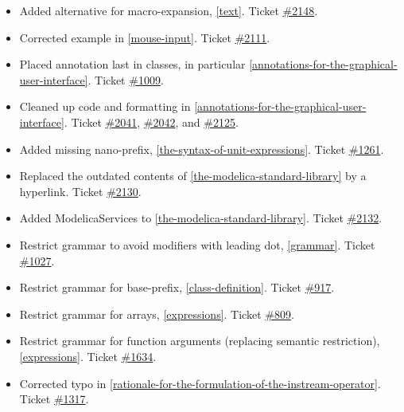 \begin{itemize}
\item
  Added alternative for macro-expansion, \autoref{text}. Ticket
  \href{https://github.com/modelica/ModelicaSpecification/issues/2148}{\#2148}.
\item
  Corrected example in \autoref{mouse-input}. Ticket
  \href{https://github.com/modelica/ModelicaSpecification/issues/2111}{\#2111}.
\item
  Placed annotation last in classes, in particular \autoref{annotations-for-the-graphical-user-interface}. Ticket
  \href{https://github.com/modelica/ModelicaSpecification/issues/1009}{\#1009}.
\item
  Cleaned up code and formatting in \autoref{annotations-for-the-graphical-user-interface}. Ticket
  \href{https://github.com/modelica/ModelicaSpecification/issues/2041}{\#2041},
  \href{https://github.com/modelica/ModelicaSpecification/issues/2042}{\#2042}, and
  \href{https://github.com/modelica/ModelicaSpecification/issues/2125}{\#2125}.
\item
  Added missing nano-prefix, \autoref{the-syntax-of-unit-expressions}. Ticket
  \href{https://github.com/modelica/ModelicaSpecification/issues/1261}{\#1261}.
\item
  Replaced the outdated contents of \autoref{the-modelica-standard-library} by a hyperlink. Ticket
  \href{https://github.com/modelica/ModelicaSpecification/issues/2130}{\#2130}.
\item
  Added ModelicaServices to \autoref{the-modelica-standard-library}. Ticket
  \href{https://github.com/modelica/ModelicaSpecification/issues/2132}{\#2132}.
\item
  Restrict grammar to avoid modifiers with leading dot, \autoref{grammar}.
  Ticket \href{https://github.com/modelica/ModelicaSpecification/issues/1027}{\#1027}.
\item
  Restrict grammar for base-prefix, \autoref{class-definition}. Ticket
  \href{https://github.com/modelica/ModelicaSpecification/issues/917}{\#917}.
\item
  Restrict grammar for arrays, \autoref{expressions}. Ticket
  \href{https://github.com/modelica/ModelicaSpecification/issues/809}{\#809}.
\item
  Restrict grammar for function arguments (replacing semantic
  restriction), \autoref{expressions}. Ticket
  \href{https://github.com/modelica/ModelicaSpecification/issues/1634}{\#1634}.
\item
  Corrected typo in \autoref{rationale-for-the-formulation-of-the-instream-operator}. Ticket
  \href{https://github.com/modelica/ModelicaSpecification/issues/1317}{\#1317}.
\end{itemize}


